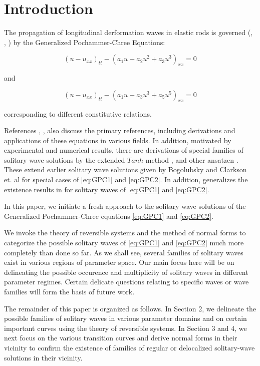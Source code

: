 \section{Introduction}

The propagation of longitudinal derformation waves in elastic rods is governed (\cite{LCZ}, \cite{Runz}, \cite{WM})
by the Generalized Pochammer-Chree Equations:

\begin{equation}\label{eq:GPC1}
\left( u - u_{xx} \right)_{tt} - \left( a_1 u + a_2 u^2 + a_3 u^3 \right)_{xx} =0  
\end{equation}

and

\begin{equation}  \label{eq:GPC2} 
\left( u - u_{xx} \right)_{tt} - \left( a_1 u + a_3 u^3 + a_5 u^5 \right)_{xx} =0
\end{equation}

corresponding to different constitutive relations.

References \cite{LCZ}, \cite{Runz}, \cite{WM} also discuss the primary references, including derivations and
applications of these equations in various fields. In addition, motivated by experimental and numerical results, there
are derivations of special families of solitary wave solutions by the extended $Tanh$ method \cite{LCZ}, and other
ansatzen \cite{WM}. These extend earlier solitary wave solutions given by Bogolubsky \cite{Bogo} and Clarkson et. al \cite{CLVS} for
special cases of \eqref{eq:GPC1} and \eqref{eq:GPC2}. In addition, \cite{Runz} generalizes the existence results in \cite{Sax} for
solitary waves of \eqref{eq:GPC1} and \eqref{eq:GPC2}.  

In this paper, we initiate a fresh approach to the solitary wave solutions of the Generalized Pochammer-Chree equations \eqref{eq:GPC1} and \eqref{eq:GPC2}. 

We invoke the theory of reversible systems and the method of normal forms to categorize the possible solitary waves of \eqref{eq:GPC1} 
and \eqref{eq:GPC2} much more completely than done so far.  
As we shall see, several families of solitary waves exist in various regions of parameter space. Our main focus here will be on 
delineating the possible occurence and multiplicity of solitary waves in different parameter regimes. Certain delicate questions
relating to specific waves or wave families will form the basis of future work. 

The remainder of this paper is organized as follows. In Section 2, we delineate the possible families of solitary waves
in various parameter domains and on certain important curves using the theory of reversible systems. In Section 3 and 4, we next
focus on the various transition curves and derive normal forms in their vicinity to confirm the existence of families of 
regular or delocalized solitary-wave solutions in their vicinity.
